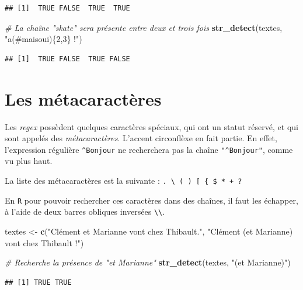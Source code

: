 \documentclass[
  11pt,
]{book}
\newenvironment{Shaded}{\begin{snugshade}}{\end{snugshade}}
\newcommand{\CommentTok}[1]{\textcolor[rgb]{0.56,0.35,0.01}{\textit{#1}}}
\newcommand{\KeywordTok}[1]{\textcolor[rgb]{0.13,0.29,0.53}{\textbf{#1}}}
\newcommand{\NormalTok}[1]{#1}
\newcommand{\StringTok}[1]{\textcolor[rgb]{0.31,0.60,0.02}{#1}}
\numberwithin{equation}{section}
\numberwithin{countremarque}{section}
\begin{document}
\begin{lstlisting}
## [1]  TRUE FALSE  TRUE  TRUE
\end{lstlisting}

\begin{Shaded}
\begin{Highlighting}[]
\CommentTok{\# La chaîne "skate" sera présente entre deux et trois fois}
\KeywordTok{str\_detect}\NormalTok{(textes, }\StringTok{"a(\#maisoui)\{2,3\} !"}\NormalTok{)}
\end{Highlighting}
\end{Shaded}

\begin{lstlisting}
## [1]  TRUE FALSE  TRUE FALSE
\end{lstlisting}

\hypertarget{manip_regex_metacaracteres}{%
\section{Les métacaractères}\label{manip_regex_metacaracteres}}

Les \emph{regex} possèdent quelques caractères spéciaux, qui ont un statut réservé, et qui sont appelés des \emph{métacaractères}. L'accent circonflèxe en fait partie. En effet, l'expression régulière \texttt{\^{}Bonjour} ne recherchera pas la chaîne \texttt{"\^{}Bonjour"}, comme vu plus haut.

La liste des métacaractères est la suivante : \texttt{.\ \textbackslash{}\textbar{}\ (\ )\ {[}\ \{\ \$\ *\ +\ ?}

En \texttt{R} pour pouvoir rechercher ces caractères dans des chaînes, il faut les échapper, à l'aide de deux barres obliques inversées \texttt{\textbackslash{}\textbackslash{}}.

\begin{Shaded}
\begin{Highlighting}[]
\NormalTok{textes \textless{}{-}}\StringTok{ }\KeywordTok{c}\NormalTok{(}\StringTok{"Clément et Marianne vont chez Thibault."}\NormalTok{,}
           \StringTok{"Clément (et Marianne) vont chez Thibault !"}\NormalTok{)}

\CommentTok{\# Recherche la présence de "et Marianne"}
\KeywordTok{str\_detect}\NormalTok{(textes, }\StringTok{"(et Marianne)"}\NormalTok{)}
\end{Highlighting}
\end{Shaded}

\begin{lstlisting}
## [1] TRUE TRUE
\end{lstlisting}
\end{document}
